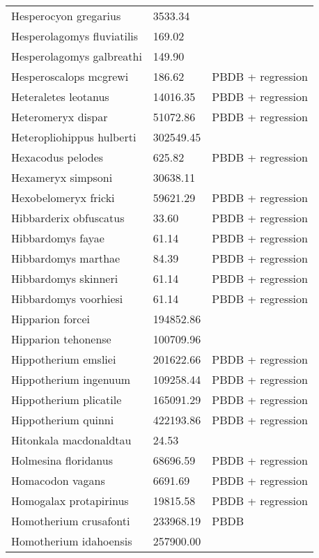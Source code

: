 \documentclass{article}
\begin{document}
\begin{center}
\begin{longtable}{p{} p{} p{} }
  Hesperocyon gregarius & 3533.34 & \cite{Tomiya2013} \\ 
  Hesperolagomys fluviatilis & 169.02 & \cite{Tomiya2013} \\ 
  Hesperolagomys galbreathi & 149.90 & \cite{Tomiya2013} \\ 
  Hesperoscalops mcgrewi & 186.62 & PBDB + regression \\ 
  Heteraletes leotanus & 14016.35 & PBDB + regression \\ 
  Heteromeryx dispar & 51072.86 & PBDB + regression \\ 
  Heteropliohippus hulberti & 302549.45 & \cite{Tomiya2013} \\ 
  Hexacodus pelodes & 625.82 & PBDB + regression \\ 
  Hexameryx simpsoni & 30638.11 & \cite{Tomiya2013} \\ 
  Hexobelomeryx fricki & 59621.29 & PBDB + regression \\ 
  Hibbarderix obfuscatus & 33.60 & PBDB + regression \\ 
  Hibbardomys fayae & 61.14 & PBDB + regression \\ 
  Hibbardomys marthae & 84.39 & PBDB + regression \\ 
  Hibbardomys skinneri & 61.14 & PBDB + regression \\ 
  Hibbardomys voorhiesi & 61.14 & PBDB + regression \\ 
  Hipparion forcei & 194852.86 & \cite{Tomiya2013} \\ 
  Hipparion tehonense & 100709.96 & \cite{Tomiya2013} \\ 
  Hippotherium emsliei & 201622.66 & PBDB + regression \\ 
  Hippotherium ingenuum & 109258.44 & PBDB + regression \\ 
  Hippotherium plicatile & 165091.29 & PBDB + regression \\ 
  Hippotherium quinni & 422193.86 & PBDB + regression \\ 
  Hitonkala macdonaldtau & 24.53 & \cite{Tomiya2013} \\ 
  Holmesina floridanus & 68696.59 & PBDB + regression \\ 
  Homacodon vagans & 6691.69 & PBDB + regression \\ 
  Homogalax protapirinus & 19815.58 & PBDB + regression \\ 
  Homotherium crusafonti & 233968.19 & PBDB \\ 
  Homotherium idahoensis & 257900.00 & \cite{McKenna2011} \\ 

\end{longtable}
\end{center}
\end{document}
